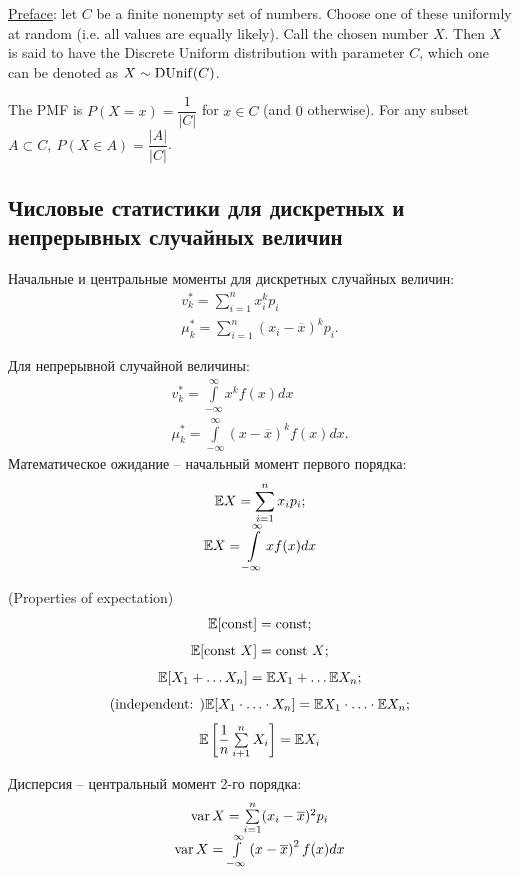 \par 
\underline{Preface}: let $C$ be a finite nonempty set of numbers. Choose one of these uniformly at random (i.e. all values are equally likely). Call the chosen number $X$. Then $X$ is said to have the Discrete Uniform distribution with parameter $C$, which one can be denoted as $X \sim \operatorname{DUnif}(C)$.

\begin{note}{}{}
    The PMF is $P(X = x) = \dfrac{1}{|C|}$ for $x \in C$ (and $0$ otherwise). For any subset $A \subset C, \ P(X \in A) = \dfrac{|A|}{|C|}$.
\end{note}

\subsection*{Числовые статистики для дискретных и непрерывных случайных величин}
\par
Начальные и центральные моменты для дискретных случайных величин:
\[
    \begin{array}{c}
        \displaystyle v^*_k = \sum\limits_{i=1}^{n} x^k_i p_i\\
        \displaystyle \mu_k^* = \sum\limits_{i=1}^{n} \left(x_i - \overline{x}\right)^kp_i.
    \end{array}
\]
\par 
Для непрерывной случайной величины:
\[
    \begin{array}{c}
    \displaystyle v_k^* = \int\limits_{-\infty}^{\infty} x^k f(x)dx\\
    \displaystyle \mu_k^* = \int\limits_{-\infty}^{\infty} \left(x - \overline{x}\right)^kf(x)dx.
    \end{array}
\]
Математическое ожидание -- начальный момент первого порядка:
\[
    \begin{array}{c}
    \displaystyle\mathbb{E} X = \sum\limits_{i=1}^n x_ip_i;\\
    \displaystyle\mathbb{E} X = \int\limits_{-\infty}^\infty xf(x)dx
    \end{array}  
\]
\begin{theorema}{(Properties of expectation)}{}
    \[
        \begin{array}{c}
            \mathbb{E}[\text{const}] = \text{const} ;\\[0.25cm]
            \mathbb{E}[\text{const } X] = \text{const } X;\\[0.25cm]
            \mathbb{E}[X_1 + \ldots X_n] = \mathbb{E} X_1 + \ldots \mathbb{E} X_n;\\[0.25cm]
            (\text{independent: }) \mathbb{E}[X_1 \cdot \ldots \cdot X_n] = \mathbb{E} X_1 \cdot \ldots \cdot \mathbb{E} X_n;\\[0.25cm]
            \mathbb{E} \left[\dfrac{1}{n}\sum\limits_{i+1}^nX_i\right] = \mathbb{E} X_i
        \end{array}  
    \]
\end{theorema}
\par
Дисперсия -- центральный момент 2-го порядка:
\[
    \begin{array}{c}
        \operatorname{var} X = \sum\limits_{i=1}^n (x_i - \overline{x})^2 p_i\\
        \operatorname{var} X = \int\limits_{-\infty}^\infty \left(x - \overline{x}\right)^2f(x) dx
    \end{array}  
\]

